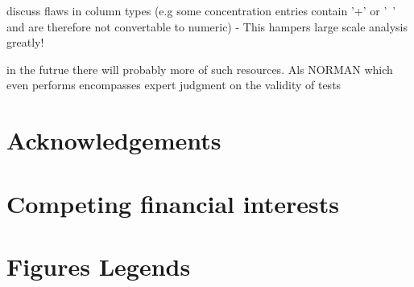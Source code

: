 \documentclass[english]{article}
\begin{document}
discuss flaws in column types (e.g some concentration entries contain '+' or '~' and are therefore not convertable to numeric) - This hampers large scale analysis greatly!




in the futrue there will probably more of such resources. Als NORMAN which even performs encompasses expert judgment on the validity of tests




\section*{Acknowledgements}


\section*{Competing financial interests}


\section*{Figures Legends}
\end{document}
